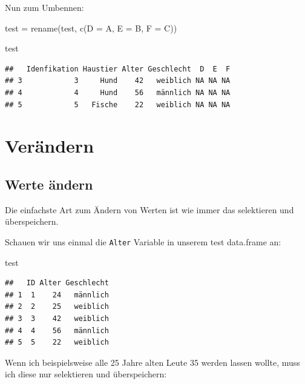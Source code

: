 \documentclass[
]{book}
\newenvironment{Shaded}{\begin{snugshade}}{\end{snugshade}}
\newcommand{\AttributeTok}[1]{\textcolor[rgb]{0.77,0.63,0.00}{#1}}
\newcommand{\DecValTok}[1]{\textcolor[rgb]{0.00,0.00,0.81}{#1}}
\newcommand{\FunctionTok}[1]{\textcolor[rgb]{0.00,0.00,0.00}{#1}}
\newcommand{\NormalTok}[1]{#1}
\newcommand{\OtherTok}[1]{\textcolor[rgb]{0.56,0.35,0.01}{#1}}
\newcommand{\SpecialCharTok}[1]{\textcolor[rgb]{0.00,0.00,0.00}{#1}}
\begin{document}
Nun zum Umbennen:

\begin{Shaded}
\begin{Highlighting}[]
\NormalTok{test }\OtherTok{=} \FunctionTok{rename}\NormalTok{(test, }\FunctionTok{c}\NormalTok{(}\AttributeTok{D =}\NormalTok{ A, }
                      \AttributeTok{E =}\NormalTok{ B,}
                      \AttributeTok{F =}\NormalTok{ C))}

\NormalTok{test}
\end{Highlighting}
\end{Shaded}

\begin{verbatim}
##   Idenfikation Haustier Alter Geschlecht  D  E  F
## 3            3     Hund    42   weiblich NA NA NA
## 4            4     Hund    56   männlich NA NA NA
## 5            5   Fische    22   weiblich NA NA NA
\end{verbatim}

\hypertarget{veruxe4ndern}{%
\section{Verändern}\label{veruxe4ndern}}

\hypertarget{werte-uxe4ndern}{%
\subsection{Werte ändern}\label{werte-uxe4ndern}}

Die einfachste Art zum Ändern von Werten ist wie immer das selektieren und überspeichern.

Schauen wir uns einmal die \texttt{Alter} Variable in unserem test data.frame an:

\begin{Shaded}
\begin{Highlighting}[]
\NormalTok{test}
\end{Highlighting}
\end{Shaded}

\begin{verbatim}
##   ID Alter Geschlecht
## 1  1    24   männlich
## 2  2    25   weiblich
## 3  3    42   weiblich
## 4  4    56   männlich
## 5  5    22   weiblich
\end{verbatim}

Wenn ich beispielsweise alle 25 Jahre alten Leute 35 werden lassen wollte, muss ich diese nur selektieren und überspeichern:

\begin{Shaded}
\end{Shaded}
\end{document}
